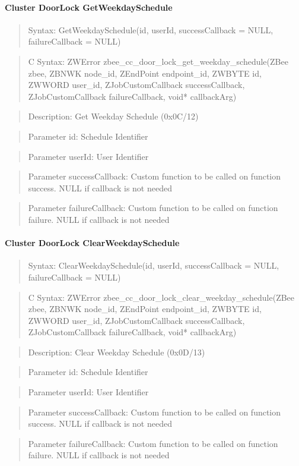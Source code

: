 \paragraph{Cluster DoorLock GetWeekdaySchedule}
\begin{quote}Syntax: GetWeekdaySchedule(id, userId, successCallback = NULL, failureCallback = NULL)\end{quote}
\begin{quote}C Syntax: ZWError zbee\_cc\_door\_lock\_get\_weekday\_schedule(ZBee zbee, ZBNWK node\_id, ZEndPoint endpoint\_id, ZWBYTE id, ZWWORD user\_id, ZJobCustomCallback successCallback, ZJobCustomCallback failureCallback, void* callbackArg)\end{quote}
\begin{quote}Description: Get Weekday Schedule (0x0C/12)\end{quote}
\begin{quote}Parameter id: Schedule Identifier\end{quote}
\begin{quote}Parameter userId: User Identifier\end{quote}
\begin{quote}Parameter successCallback: Custom function to be called on function success. NULL if callback is not needed\end{quote}
\begin{quote}Parameter failureCallback: Custom function to be called on function failure. NULL if callback is not needed\end{quote}


\paragraph{Cluster DoorLock ClearWeekdaySchedule}
\begin{quote}Syntax: ClearWeekdaySchedule(id, userId, successCallback = NULL, failureCallback = NULL)\end{quote}
\begin{quote}C Syntax: ZWError zbee\_cc\_door\_lock\_clear\_weekday\_schedule(ZBee zbee, ZBNWK node\_id, ZEndPoint endpoint\_id, ZWBYTE id, ZWWORD user\_id, ZJobCustomCallback successCallback, ZJobCustomCallback failureCallback, void* callbackArg)\end{quote}
\begin{quote}Description: Clear Weekday Schedule (0x0D/13)\end{quote}
\begin{quote}Parameter id: Schedule Identifier\end{quote}
\begin{quote}Parameter userId: User Identifier\end{quote}
\begin{quote}Parameter successCallback: Custom function to be called on function success. NULL if callback is not needed\end{quote}
\begin{quote}Parameter failureCallback: Custom function to be called on function failure. NULL if callback is not needed\end{quote}


